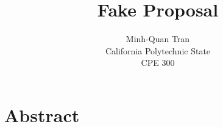 
\title{Fake Proposal}

\author{Minh-Quan Tran\\
California Polytechnic State\\
CPE 300}

\date{}
\maketitle

\section{Abstract}
